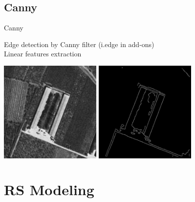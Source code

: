 \documentclass[xcolor=dvipsnames,beamer]{beamer} %
\begin{document}
\subsection{Canny}
\begin{frame}[fragile]{Canny}

Edge detection by Canny filter (i.edge in add-ons)\\
Linear features extraction
\begin{center}
 \includegraphics[width=5cm]{farm}
 \hspace{10mm}
 \includegraphics[width=5cm]{farm_canny}
\end{center}

\end{frame}

\section{RS Modeling}
\end{document}
